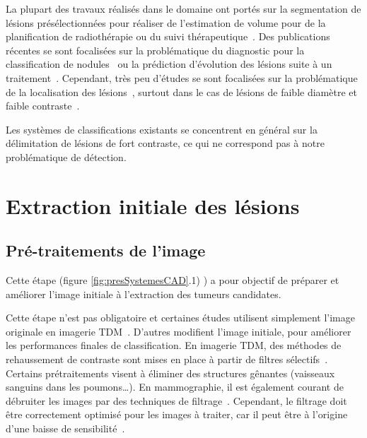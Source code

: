 La plupart des travaux réalisés dans le domaine ont portés sur la segmentation de lésions présélectionnées pour réaliser de l'estimation de volume pour de la planification de radiothérapie ou du suivi thérapeutique~\cite{kanakatte2007pilot, potesil2007automated, kanakatte2008pulmonary, yu2009automated}. Des publications récentes se sont focalisées sur la problématique du diagnostic pour la classification de nodules~\cite{nie2006integrating} ou la prédiction d'évolution des lésions suite à un traitement~\cite{el2009exploring}. Cependant, très peu d'études se sont focalisées sur la problématique de la localisation des lésions~\cite{guan2006automatic, kanakatte2007pilot, kanakatte2008pulmonary, mhd2010artificial}, surtout dans le cas de lésions de faible diamètre et faible contraste~\cite{ying2004novel, jafar2006computerized, saradhi2009framework}.

Les systèmes de classifications existants se concentrent en général sur la délimitation de lésions de fort contraste, ce qui ne correspond pas à notre problématique de détection. 


\section{Extraction initiale des lésions}

	\subsection{Pré-traitements de l'image}

Cette étape (figure \ref{fig:presSystemesCAD}.1) ) a pour objectif de préparer et améliorer l’image initiale à l’extraction des tumeurs candidates. 

Cette étape n'est pas obligatoire et certaines études utilisent simplement l’image originale en imagerie TDM~\cite{mougiakakou2007differential}. D’autres modifient l’image initiale, pour améliorer les performances finales de classification. En imagerie TDM, des méthodes de rehaussement de contraste sont mises en place à partir de filtres sélectifs~\cite{li2003selective}. Certains prétraitements visent à éliminer des structures gênantes (vaisseaux sanguins dans les poumons…). En mammographie, il est également courant de débruiter les images par des techniques de filtrage~\cite{bazzani2001svm}. Cependant, le filtrage doit être correctement optimisé pour les images à traiter, car il peut être à l'origine d'une baisse de sensibilité~\cite{ge2005computer}.
	
